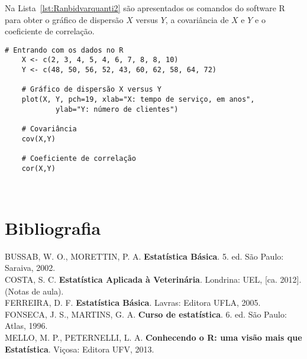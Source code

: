 \documentclass[11pt,fleqn]{book} %
\begin{document}
\vspace{0,3cm}

Na Lista~\ref{lst:Ranbidvarquanti2} são apresentados os comandos do software R para obter o gráfico de dispersão $X$ versus $Y$, a covariância de $X$ e $Y$ e o coeficiente de correlação.\\

\begin{scriptsize}
	\estiloR
	\begin{lstlisting}[caption={Comandos do software R}, label=lst:Ranbidvarquanti2]
	# Entrando com os dados no R
	X <- c(2, 3, 4, 5, 4, 6, 7, 8, 8, 10)
	Y <- c(48, 50, 56, 52, 43, 60, 62, 58, 64, 72)
	
	# Gráfico de dispersão X versus Y
	plot(X, Y, pch=19, xlab="X: tempo de serviço, em anos", 
			ylab="Y: número de clientes")
			
	# Covariância
	cov(X,Y)

	# Coeficiente de correlação
	cor(X,Y)

	
	\end{lstlisting}
\end{scriptsize}




\chapter*{Bibliografia}


\noindent BUSSAB, W. O., MORETTIN, P. A. {\bf Estatística Básica}. 5. ed. São Paulo: Saraiva, 2002. \\

\noindent COSTA, S. C. {\bf Estatística Aplicada à Veterinária}. Londrina: UEL, [ca. 2012]. (Notas de aula). \\

\noindent FERREIRA, D. F. {\bf Estatística Básica}. Lavras: Editora UFLA, 2005. \\

\noindent FONSECA, J. S., MARTINS, G. A.  {\bf Curso de estatística}. 6. ed. São Paulo: Atlas, 1996. \\

\noindent MELLO, M. P., PETERNELLI, L. A. {\bf Conhecendo o R: uma visão mais que Estatística}. Viçosa: Editora UFV, 2013. \\
\end{document}
